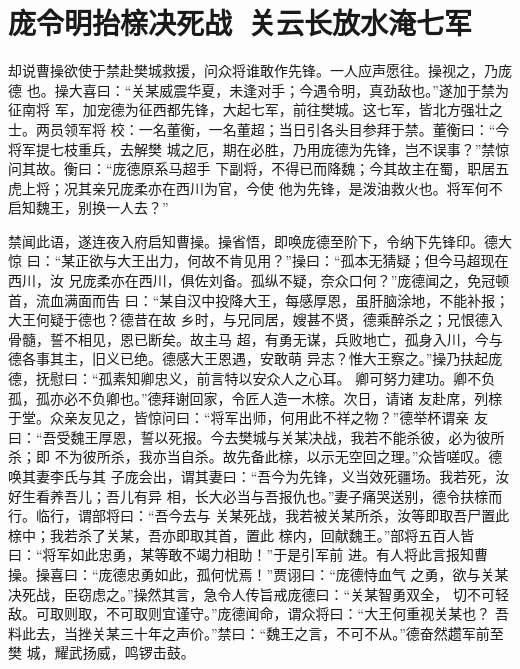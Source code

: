 \chapter{庞令明抬榇决死战~关云长放水淹七军}

却说曹操欲使于禁赴樊城救援，问众将谁敢作先锋。一人应声愿往。操视之，乃庞德
也。操大喜曰：“关某威震华夏，未逢对手；今遇令明，真劲敌也。”遂加于禁为征南将
军，加宠德为征西都先锋，大起七军，前往樊城。这七军，皆北方强壮之士。两员领军将
校：一名董衡，一名董超；当日引各头目参拜于禁。董衡曰：“今将军提七枝重兵，去解樊
城之厄，期在必胜，乃用庞德为先锋，岂不误事？”禁惊问其故。衡曰：“庞德原系马超手
下副将，不得已而降魏；今其故主在蜀，职居五虎上将；况其亲兄庞柔亦在西川为官，今使
他为先锋，是泼油救火也。将军何不启知魏王，别换一人去？”

禁闻此语，遂连夜入府启知曹操。操省悟，即唤庞德至阶下，令纳下先锋印。德大惊
曰：“某正欲与大王出力，何故不肯见用？”操曰：“孤本无猜疑；但今马超现在西川，汝
兄庞柔亦在西川，俱佐刘备。孤纵不疑，奈众口何？”庞德闻之，免冠顿首，流血满面而告
曰：“某自汉中投降大王，每感厚恩，虽肝脑涂地，不能补报；大王何疑于德也？德昔在故
乡时，与兄同居，嫂甚不贤，德乘醉杀之；兄恨德入骨髓，誓不相见，恩已断矣。故主马
超，有勇无谋，兵败地亡，孤身入川，今与德各事其主，旧义已绝。德感大王恩遇，安敢萌
异志？惟大王察之。”操乃扶起庞德，抚慰曰：“孤素知卿忠义，前言特以安众人之心耳。
卿可努力建功。卿不负孤，孤亦必不负卿也。”德拜谢回家，令匠人造一木榇。次日，请诸
友赴席，列榇于堂。众亲友见之，皆惊问曰：“将军出师，何用此不祥之物？”德举杯谓亲
友曰：“吾受魏王厚恩，誓以死报。今去樊城与关某决战，我若不能杀彼，必为彼所杀；即
不为彼所杀，我亦当自杀。故先备此榇，以示无空回之理。”众皆嗟叹。德唤其妻李氏与其
子庞会出，谓其妻曰：“吾今为先锋，义当效死疆场。我若死，汝好生看养吾儿；吾儿有异
相，长大必当与吾报仇也。”妻子痛哭送别，德令扶榇而行。临行，谓部将曰：“吾今去与
关某死战，我若被关某所杀，汝等即取吾尸置此榇中；我若杀了关某，吾亦即取其首，置此
榇内，回献魏王。”部将五百人皆曰：“将军如此忠勇，某等敢不竭力相助！”于是引军前
进。有人将此言报知曹操。操喜曰：“庞德忠勇如此，孤何忧焉！”贾诩曰：“庞德恃血气
之勇，欲与关某决死战，臣窃虑之。”操然其言，急令人传旨戒庞德曰：“关某智勇双全，
切不可轻敌。可取则取，不可取则宜谨守。”庞德闻命，谓众将曰：“大王何重视关某也？
吾料此去，当挫关某三十年之声价。”禁曰：“魏王之言，不可不从。”德奋然趱军前至樊
城，耀武扬威，鸣锣击鼓。

